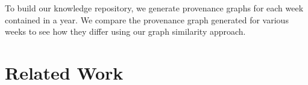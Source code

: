 To build our knowledge repository, we generate provenance graphs for each week contained in a year. We compare the provenance graph generated for various weeks to see how they differ using our graph similarity approach.


%




%




\section{Related Work}

